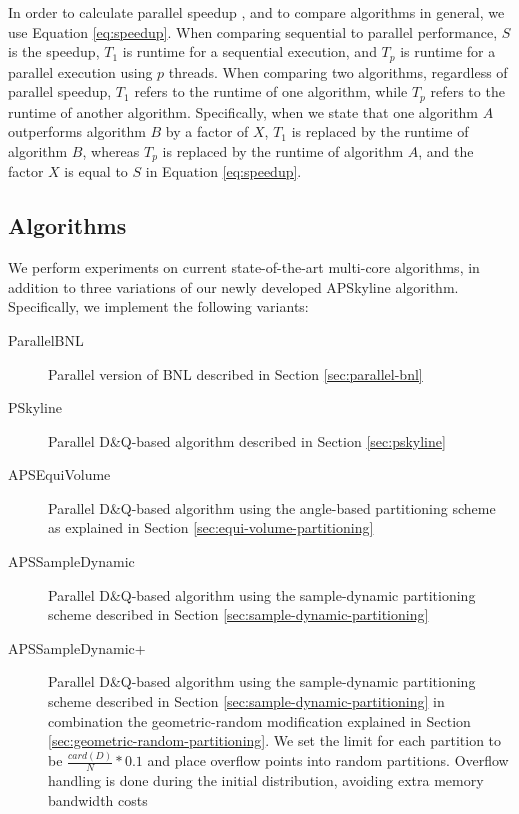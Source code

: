 \documentclass[12pt,a4paper,twoside]{report}
\begin{document}
In order to calculate parallel speedup \cite{sun1990another}, and
to compare algorithms in general, we use Equation \ref{eq:speedup}.
When comparing sequential to parallel performance, $S$ is the speedup,
$T_1$ is runtime for a sequential execution, and $T_p$ is runtime for
a parallel execution using $p$ threads. When comparing two algorithms,
regardless of parallel speedup, $T_1$ refers to the runtime of one
algorithm, while $T_p$ refers to the runtime of another algorithm.
Specifically, when we state that one algorithm $A$ outperforms algorithm
$B$ by a factor of $X$, $T_1$ is replaced by the runtime of algorithm
$B$, whereas $T_p$ is replaced by the runtime of algorithm $A$, and
the factor $X$ is equal to $S$ in Equation \ref{eq:speedup}.

\subsection{Algorithms}

We perform experiments on current state-of-the-art multi-core
algorithms, in addition to three variations of our newly
developed APSkyline algorithm. Specifically, we implement the
following variants:

\begin{description}
	\item[ParallelBNL] Parallel version of BNL described in
	Section \ref{sec:parallel-bnl}
	\item[PSkyline] Parallel D\&Q-based algorithm described in
	Section \ref{sec:pskyline}
	\item[APSEquiVolume] Parallel D\&Q-based algorithm using
	the angle-based partitioning scheme as explained in Section
	\ref{sec:equi-volume-partitioning}
	\item[APSSampleDynamic] Parallel D\&Q-based algorithm
	using the sample-dynamic partitioning scheme described in
	Section \ref{sec:sample-dynamic-partitioning}
	\item[APSSampleDynamic+] Parallel D\&Q-based algorithm
	using the sample-dynamic partitioning scheme described in
	Section \ref{sec:sample-dynamic-partitioning} in
	combination the geometric-random modification explained in
	Section \ref{sec:geometric-random-partitioning}. We set the limit for
	each partition to be $\frac{card(D)}{N}*0.1$ and place
	overflow points into random partitions. Overflow handling
	is done during the initial distribution, avoiding extra
	memory bandwidth costs
\end{description}
\end{document}
